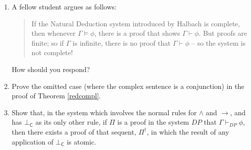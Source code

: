 {\begin{enumerate}
\begin{enumerate}
\end{enumerate} 
\item A fellow student argues as follows: \begin{quotation}
	If the Natural Deduction system introduced by Halbach is complete, then whenever $\Gamma \vDash \phi$, there is a proof that shows $\Gamma \vdash \phi$. But proofs are finite; so if $\Gamma$ is infinite, there is no proof that $\Gamma \vdash \phi$ – so the system is not complete!
\end{quotation} How should you respond?
\item Prove the omitted case (where the complex sentence is a conjunction) in the proof of Theorem \ref{redcompl}.
\item Show  that, in the system which involves the normal rules for $\wedge$ and $\to$, and has $\bot_{\mathsf{C}}$ as its only other rule, if $\Pi$ is a proof in the system $DP$ that $\Gamma \vdash_{DP}\phi$, then there exists a proof of that sequent, $\Pi^{\dag}$, in which the result of any application of $\bot_{\mathsf{C}}$ is atomic.
\end{enumerate}





}





